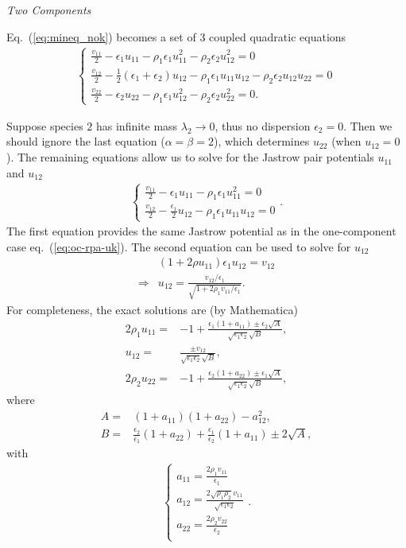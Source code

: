 \textit{Two Components}

Eq.~(\ref{eq:mineq_nok}) becomes a set of 3 coupled quadratic equations
\begin{align}
\left\{\begin{array}{l}
\frac{v_{11}}{2} - \epsilon_1 u_{11} - \rho_1\epsilon_1u_{11}^2 - \rho_2\epsilon_2u_{12}^2 = 0 \\
\frac{v_{12}}{2} - \frac{1}{2}(\epsilon_1+\epsilon_2) u_{12} - \rho_1\epsilon_1u_{11}u_{12} - \rho_2\epsilon_2u_{12}u_{22} = 0 \\
\frac{v_{22}}{2} - \epsilon_2 u_{22} - \rho_1\epsilon_1u_{12}^2 - \rho_2\epsilon_2u_{22}^2 = 0.
\end{array}\right.
\end{align}

Suppose species $2$ has infinite mass $\lambda_2\rightarrow0$, thus no dispersion $\epsilon_2=0$. Then we should ignore the last equation ($\alpha=\beta=2$), which determines $u_{22}$ (when $u_{12}=0$). The remaining equations allow us to solve for the Jastrow pair potentials $u_{11}$ and $u_{12}$
\begin{align}
\left\{\begin{array}{l}
\frac{v_{11}}{2} - \epsilon_1 u_{11} - \rho_1\epsilon_1u_{11}^2 = 0 \\
\frac{v_{12}}{2} - \frac{\epsilon_1}{2} u_{12} - \rho_1\epsilon_1u_{11}u_{12} = 0
\end{array}\right..
\end{align}
The first equation provides the same Jastrow potential as in the one-component case eq.~(\ref{eq:oc-rpa-uk}). The second equation can be used to solve for $u_{12}$
\begin{align}
&(1+2\rho u_{11}) \epsilon_1 u_{12} = v_{12} \nonumber \\
\Rightarrow & u_{12} = \frac{v_{12}/\epsilon_1}{\sqrt{1+2\rho_1v_{11}/\epsilon_1}}.
\end{align}
For completeness, the exact solutions are (by Mathematica)
\begin{align}
2\rho_1u_{11} =& -1+\frac{\epsilon_1(1+a_{11}) \pm \epsilon_2\sqrt{A}}
{
\sqrt{\epsilon_1\epsilon_2}\sqrt{B}
},\\
u_{12} =& \frac{\pm v_{12} }{
\sqrt{\epsilon_1\epsilon_2}\sqrt{B}
},\\
2\rho_2u_{22} =& -1+\frac{\epsilon_2(1+a_{22}) \pm \epsilon_1\sqrt{A}}
{
\sqrt{\epsilon_1\epsilon_2}\sqrt{B}
},
\end{align}
where 
\begin{align}
A =& (1+a_{11})(1+a_{22})-a_{12}^2,\\
B =&\frac{\epsilon_2}{\epsilon_1}(1+a_{22}) + \frac{\epsilon_1}{\epsilon_2}(1+a_{11}) \pm 2\sqrt{A},
\end{align}
with
\begin{align}
\left\{\begin{array}{l}
a_{11}=\frac{2\rho_1v_{11}}{\epsilon_1} \\
a_{12}=\frac{2\sqrt{\rho_1\rho_2}v_{11}}{\sqrt{\epsilon_1\epsilon_2}} \\
a_{22}=\frac{2\rho_2v_{22}}{\epsilon_2} \\
\end{array}\right..
\end{align}